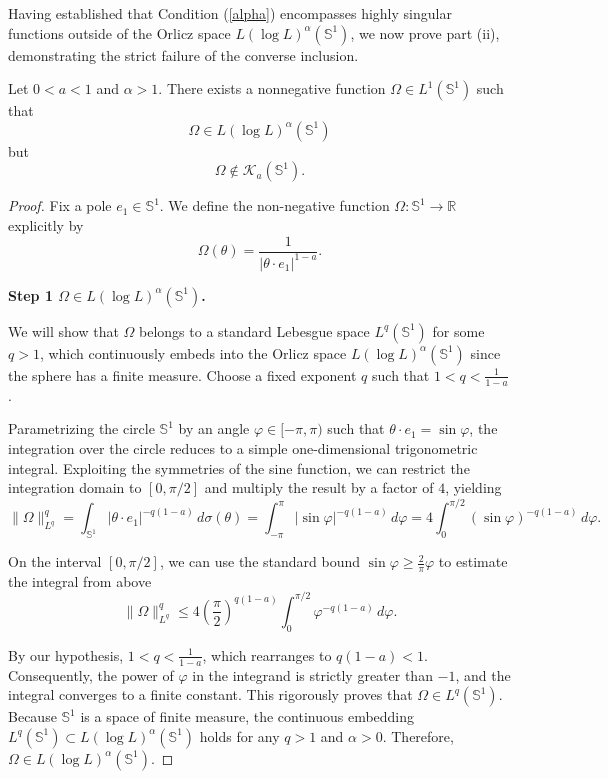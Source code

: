 \documentclass[11pt]{amsart}
\begin{document}
Having established that Condition (\ref{alpha}) encompasses highly singular functions outside of the Orlicz space $L(\log L)^\alpha(\mathbb{S}^{1})$, we now prove part (ii), demonstrating the strict failure of the converse inclusion.

\begin{proposition}\label{propreverse_orlicz}
	Let $0<a<1$ and $\alpha>1$. There exists a nonnegative function
	$\Omega \in L^1(\mathbb{S}^1)$ such that
	\[
	\Omega\in L(\log L)^\alpha(\mathbb{S}^1)
	\]
	but
	\[
	\Omega\notin \mathcal K_a(\mathbb{S}^1).
	\]
\end{proposition}

\begin{proof}
	Fix a pole $e_1 \in \mathbb{S}^1$. We define the non-negative function $\Omega: \mathbb{S}^1 \to \mathbb{R}$ explicitly by$$\Omega(\theta) = \frac{1}{|\theta \cdot e_1|^{1-a}}.$$
	
	\medskip
	\noindent\textbf{Step 1 $\Omega\in L(\log L)^\alpha(\mathbb{S}^1)$.}
	
	We will show that $\Omega$ belongs to a standard Lebesgue space $L^q(\mathbb{S}^1)$ for some $q > 1$, which continuously embeds into the Orlicz space $L(\log L)^\alpha(\mathbb{S}^1)$ since the sphere has a finite measure.
	Choose a fixed exponent $q$ such that $1 < q < \frac{1}{1-a}$.
	
	Parametrizing the circle $\mathbb{S}^1$ by an angle $\varphi \in [-\pi, \pi)$ such that $\theta \cdot e_1 = \sin\varphi$, the integration over the circle reduces to a simple one-dimensional trigonometric integral. Exploiting the symmetries of the sine function, we can restrict the integration domain to $[0, \pi/2]$ and multiply the result by a factor of $4$, yielding
	$$\|\Omega\|_{L^q}^q = \int_{\mathbb{S}^1} |\theta \cdot e_1|^{-q(1-a)} \, d\sigma(\theta) = \int_{-\pi}^\pi |\sin \varphi|^{-q(1-a)} \, d\varphi = 4 \int_0^{\pi/2} (\sin \varphi)^{-q(1-a)} \, d\varphi.$$
	
	On the interval $[0, \pi/2]$, we can use the standard bound $\sin \varphi \ge \frac{2}{\pi} \varphi$ to estimate the integral from above
	$$\|\Omega\|_{L^q}^q \le 4 \left(\frac{\pi}{2}\right)^{q(1-a)} \int_0^{\pi/2} \varphi^{-q(1-a)} \, d\varphi.$$
	
	By our hypothesis, $1 < q < \frac{1}{1-a}$, which rearranges to $q(1-a) < 1$.
	Consequently, the power of $\varphi$ in the integrand is strictly greater than $-1$, and the integral converges to a finite constant. This rigorously proves that $\Omega \in L^q(\mathbb{S}^1)$.
	Because $\mathbb{S}^1$ is a space of finite measure, the continuous embedding $L^q(\mathbb{S}^1) \subset L(\log L)^\alpha(\mathbb{S}^1)$ holds for any $q > 1$ and $\alpha > 0$. Therefore, $\Omega \in L(\log L)^\alpha(\mathbb{S}^1)$.
	

\end{proof}
\end{document}
